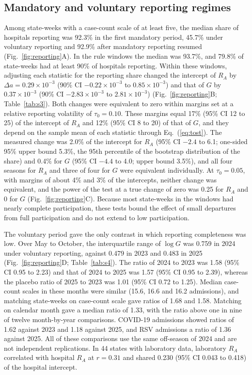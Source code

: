 \subsection{Mandatory and voluntary reporting regimes}
\label{sec:res-reporting}

Among state-weeks with a case-count scale of at least five, the median share of hospitals reporting was 92.3\% in the first mandatory period, 45.7\% under voluntary reporting and 92.9\% after mandatory reporting resumed (Fig.~\ref{fig:reporting}A). In the rule windows the median was 93.7\%, and 79.8\% of state-weeks had at least 90\% of hospitals reporting. Within these windows, adjusting each statistic for the reporting share changed the intercept of $R_A$ by $\Delta a=0.29\times10^{-3}$ (90\% CI $-0.22\times10^{-3}$ to $0.85\times10^{-3}$) and that of $G$ by $0.37\times10^{-3}$ (90\% CI $-2.83\times10^{-3}$ to $2.81\times10^{-3}$) (Fig.~\ref{fig:reporting}B; Table~\ref{tab:s3}). Both changes were equivalent to zero within margins set at a relative reporting volatility of $\tau_0=0.10$. These margins equal 17\% (95\% CI 12 to 25) of the intercept of $R_A$ and 12\% (95\% CI 8 to 20) of that of $G$, and they depend on the sample mean of each statistic through Eq.~(\ref{eq:tost}). The measured change was 2.0\% of the intercept for $R_A$ (95\% CI $-2.4$ to 6.1; one-sided 95\% upper bound 5.3\%, the 95th percentile of the bootstrap distribution of the share) and 0.4\% for $G$ (95\% CI $-4.4$ to 4.0; upper bound 3.5\%), and all four seasons for $R_A$ and three of four for $G$ were equivalent individually. At $\tau_0=0.05$, with margins of about 4\% and 3\% of the intercepts, neither change was equivalent, and the power of the test at a true change of zero was 0.25 for $R_A$ and 0 for $G$ (Fig.~\ref{fig:reporting}C). Because most state-weeks in the windows had nearly complete participation, these tests bound the effect of small departures from full participation and do not extend to low participation.

The voluntary period gave the only contrast in which reporting completeness was low. Over May to October, the interquartile range of $\log G$ was 0.759 in 2024 under voluntary reporting, against 0.479 in 2023 and 0.483 in 2025 (Fig.~\ref{fig:reporting}D; Table~\ref{tab:s4}). The ratio of 2024 to 2023 was 1.58 (95\% CI 0.95 to 2.23) and that of 2024 to 2025 was 1.57 (95\% CI 0.95 to 2.39), whereas the placebo ratio of 2025 to 2023 was 1.01 (95\% CI 0.72 to 1.25). Median case-count scales in these months were similar (15.6, 16.6 and 16.2 admissions), and matching state-weeks on case-count scale gave ratios of 1.68 and 1.58. Matching on calendar month gave a median ratio of 1.33, with the ratio above one in nine of twelve month-by-year comparisons. COVID-19 admissions showed ratios of 1.62 against 2023 and 1.18 against 2025, and RSV admissions a ratio of 1.36 against 2025. All of these comparisons use the same off-season of 2024 and are not independent replications. In 44 states with laboratory data, laboratory $R_A$ correlated with hospital $R_A$ at $r=0.31$ and shared 0.230 (95\% CI 0.043 to 0.418) of the hospital intercept.

